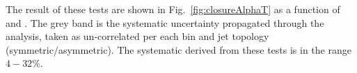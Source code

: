 The result of these tests are shown in Fig.~\ref{fig:closureAlphaT} as a function of \scalht and \njet. 
The grey band is the systematic uncertainty propagated through the analysis, 
taken as un-correlated per each \scalht bin and jet topology
(symmetric/asymmetric). The systematic derived from these tests is
in the range $4-32\%$.


\begin{figure}[h!]
  \begin{center}
    ~~
    \\
    ~~


\end{center}
\end{figure}
